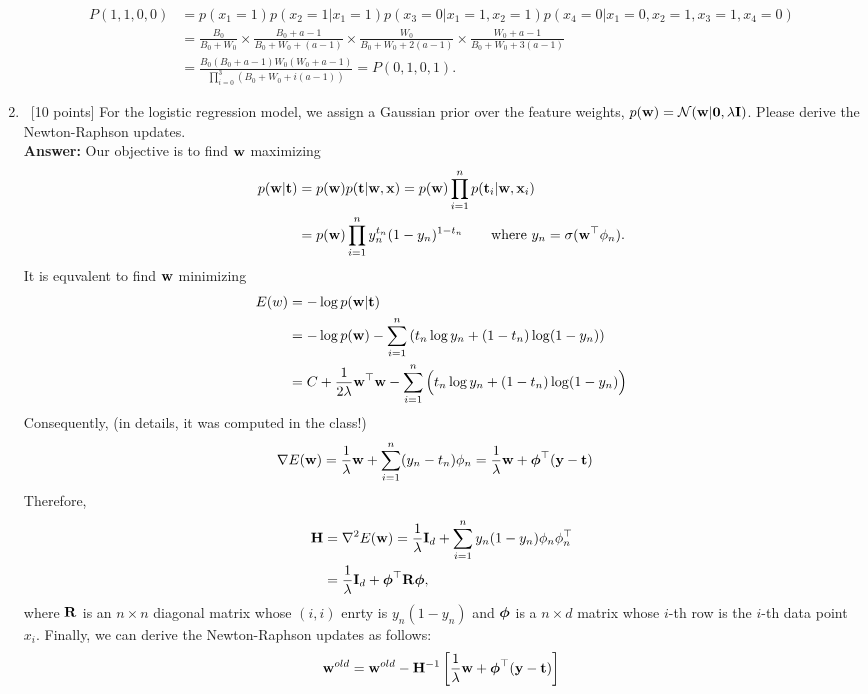 \documentclass[12pt, fullpage,letterpaper]{article}
\def\red{\color{red}}
\def\blackblue{\color{black!40!blue}}
\begin{document}
\begin{enumerate}
{	\begin{align*}
	P(1, 1, 0, 0) & = p(x_1 = 1)p(x_2=1|x_1 =1)p(x_3=0|x_1= 1, x_2 = 1)p(x_4 = 0|x_1= 0, x_2 = 1, x_3 = 1, x_4 = 0)\\
	& = \frac{B_0}{B_0+W_0} \times \frac{B_0+a-1}{B_0+W_0+ (a-1)}\times \frac{W_0}{B_0+W_0+ 2(a-1)}\times \frac{W_0+a-1}{B_0+W_0+ 3(a-1)}\\
	& = \frac{B_0(B_0+a-1)W_0(W_0+a-1)}{\prod_{i=0}^3(B_0+W_0 + i(a-1))} = P(0, 1, 0, 1).
	\end{align*}
	}
\item~[10 points] For the logistic regression model, we assign a Gaussian prior over the feature weights,  $p({\bf w}) = \mathcal{N}({\bf w}|{\bf 0}, \lambda{\bf I})$. Please derive the Newton-Raphson updates. \\
	{\bf \red Answer:} {\blackblue Our objective is to find ${\bf w}$ maximizing 
	\begin{align*}
	p({\bf w}|{\bf t}) & = p({\bf w}) p({\bf t}|{\bf w},{\bf x}) = p({\bf w})\prod_{i=1}^n p({\bf t}_i|{\bf w},{\bf x}_i)\\
	& = p({\bf w})\prod_{i=1}^n  y_n^{t_n}(1-y_n)^{1-t_n}\quad\quad\text{where $y_n = \sigma({\bf w}^\top \phi_n).$}
	\end{align*}
	It is equvalent to find ${\bf w}$ minimizing 
	\begin{align*}
	E(w) & = -\log p({\bf w}|{\bf t})\\
	& = -\log p({\bf w}) - \sum_{i=1}^n\left(t_n\log y_n + (1-t_n)\log(1-y_n)\right)  \\
	& = C + \frac{1}{2\lambda}{\bf w}^\top{\bf w} - \sum_{i=1}^n\Big(t_n\log y_n + (1-t_n)\log(1-y_n)\Big)
	\end{align*}
	Consequently, (in details, it was computed in the class!)
	\begin{align*}
	\nabla E({\bf w}) & =\frac{1}{\lambda}{\bf w} + \sum_{i=1}^n (y_n-t_n)\phi_n =  \frac{1}{\lambda}{\bf w}+  \boldsymbol{\phi}^\top({\bf y}-{\bf t})
	\end{align*}
	Therefore, 
	\begin{align*}
	{\bf H} & = \nabla^2 E({\bf w}) =\frac{1}{\lambda}{\bf I}_{d}+ \sum_{i=1}^n y_n(1-y_n)\phi_n\phi_n^\top\\
	& = \frac{1}{\lambda} {\bf I}_d + \boldsymbol{\phi}^\top {\bf R}\boldsymbol{\phi},
	\end{align*}
	where ${\bf R}$ is an $n\times n$ diagonal matrix whose $(i,i)$ enrty is $y_n(1-y_n)$ and $\boldsymbol{\phi}$ is a $n\times d$ matrix whose $i$-th row is the $i$-th data point $x_i$.
	Finally, we can derive the Newton-Raphson updates as follows:
	\begin{align*}
	\w^{old} = \w^{old} - \H^{-1}\left[\frac{1}{\lambda} \w +   \bphi^\top(\y-\t)\right]

\end{align*}}
\end{enumerate}
\end{document}
